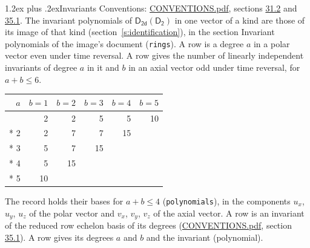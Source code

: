 \documentclass[10pt,a4paper]{article}
\makeatletter
\renewcommand\section{\@startsection{section}{1}{\z@}{-3ex plus -1ex minus -.2ex}%
  {1.2ex plus .2ex}{\normalfont\large\sffamily\bfseries\color{parttitle}}}
\numberwithin{equation}{section}
\newcommand{\grp}[1]{\mathsf{#1}}
\makeatother
\begin{document}
\section{Invariants}\label{s:invariants}
Conventions: \href{../../CONVENTIONS.pdf}{CONVENTIONS.pdf}, sections \href{../../CONVENTIONS.pdf\#conv.31.2}{31.2} and \href{../../CONVENTIONS.pdf\#conv.35.1}{35.1}.
The invariant polynomials of $\grp{D_{2d}}(\grp{D_{2}})$ in one vector of a kind are those of its image of that kind (section~\ref{s:identification}), in the section Invariant polynomials of the image's document (\texttt{rings}).
\leavevmode\label{n:index.degree.polar}\label{n:index.degree.axial}A row is a degree $a$ in a polar vector even under time reversal. A row gives the number of linearly independent invariants of degree $a$ in it and $b$ in an axial vector odd under time reversal, for $a + b \le 6$.
{\small\begin{longtable}{@{}rrrrrr@{}}\toprule
$a$ & $b = 1$ & $b = 2$ & $b = 3$ & $b = 4$ & $b = 5$\\\midrule\endhead
\bottomrule\endfoot\endlastfoot
1 & 2 & 2 & 5 & 5 & 10\\*
2 & 2 & 7 & 7 & 15 & \\*
3 & 5 & 7 & 15 &  & \\*
4 & 5 & 15 &  &  & \\*
5 & 10 &  &  &  & \\
\bottomrule\end{longtable}}
\leavevmode\label{n:local.component.polar}\label{n:local.component.axial}The record holds their bases for $a + b \le 4$ (\texttt{polynomials}), in the components $u_{x}$, $u_{y}$, $u_{z}$ of the polar vector and $v_{x}$, $v_{y}$, $v_{z}$ of the axial vector. \label{n:head.polynomial}A row is an invariant of the reduced row echelon basis of its degrees (\href{../../CONVENTIONS.pdf}{CONVENTIONS.pdf}, section \href{../../CONVENTIONS.pdf\#conv.35.1}{35.1}). A row gives its degrees $a$ and $b$ and the invariant (polynomial).
\end{document}
